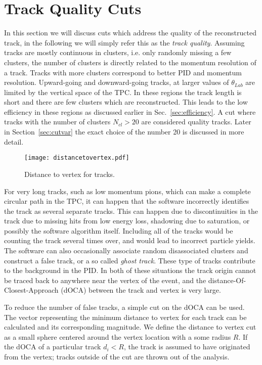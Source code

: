 \section{Track Quality Cuts}
\label{sec:qualitycut}
In this section we will discuss cuts which address the quality of the reconstructed track, in the following we will simply refer this as the \emph{track quality}. Assuming tracks are mostly continuous in clusters, i.e. only randomly missing a few clusters, the number of clusters is directly related to the momentum resolution of a track. Tracks with more clusters correspond to better PID and momentum resolution. Upward-going and downward-going tracks, at larger values of $\theta_{Lab}$ are limited by the vertical space of the TPC. In these regions the track length is short and there are few clusters which are reconstructed. This leads to the low efficiency in these regions as discussed earlier in Sec.~\ref{sec:efficiency}. A cut where tracks with the number of clusters $N_{cl} > 20$ are considered quality tracks. Later in Section~\ref{sec:cutvar} the exact choice of the number 20 is discussed in more detail.

\begin{figure}[!htb]
\centering
\texttt{[image: distancetovertex.pdf]}
\label{fig:poca}
\caption{Distance to vertex for tracks.}
\end{figure}

For very long tracks, such as low momentum pions, which can make a complete circular path in the TPC, it can happen that the software incorrectly identifies the track as several separate tracks. This can happen due to discontinuities in the track due to missing hits from low energy loss, shadowing due to saturation, or possibly the software algorithm itself. Including all of the tracks would be counting the track several times over, and would lead to incorrect particle yields. The software can also occasionally associate random disassociated clusters and construct a false track, or a so called \emph{ghost track}. These type of tracks contribute to the background in the PID. In both of these situations the track origin cannot be traced back to anywhere near the vertex of the event, and the distance-Of-Closest-Approach (dOCA) between the track and vertex is very large. 

To reduce the number of false tracks, a simple cut on the dOCA can be used. The vector representing the minimum distance to vertex for each track can be calculated and its corresponding magnitude. We define the distance to vertex cut as a small sphere centered around the vertex location with a some radius $R$. If the dOCA of a particular track $d_i < R$, the track is assumed to have originated from the vertex; tracks outside of the cut are thrown out of the analysis. 


